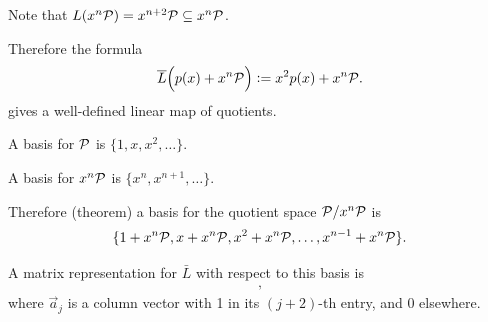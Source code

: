 \documentclass[12pt]{article}
\begin{document}

Note that $L(x^n\mathcal P) = x^{n+2}\mathcal P \subseteq x^n\mathcal P$.

Therefore the formula
\begin{align*}
  \overline L\Big(p(x) + x^n\mathcal P\Big) := x^2p(x) + x^n\mathcal P.
\end{align*}
gives a well-defined linear map of quotients.

A basis for $\mathcal P$ is $\{1, x, x^2, \ldots\}$.

A basis for $x^n\mathcal P$ is $\{x^n, x^{n+1}, \ldots\}$.

Therefore (theorem) a basis for the quotient space $\mathcal P/x^n\mathcal P$ is
\begin{align*}
  \{1 + x^n\mathcal P, x + x^n\mathcal P, x^2 + x^n\mathcal P, \ldots, x^{n-1} + x^n\mathcal P\}.
\end{align*}

A matrix representation for $\bar L$ with respect to this basis is
\begin{align*}
  [\vec a_1, \vec a_2, \ldots, \vec a_{n-1}],
\end{align*}
where $\vec a_{j}$ is a column vector with 1 in its $(j + 2)$-th entry, and 0 elsewhere.
\end{document}
